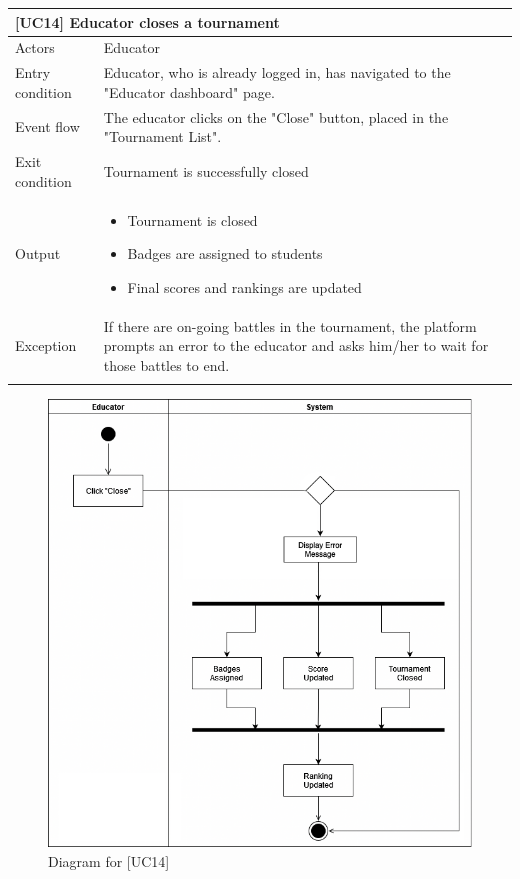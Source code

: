 \documentclass[12pt,oneside,a4paper]{article}
\begin{document}
\clearpage

\begin{table}[htbp]
\begin{tabular}{|l|p{12cm}|}
    \hline
    \multicolumn{2}{|l|}{\textbf{[UC14] Educator closes a tournament}}\\
    \hline
    Actors & Educator\\
    \hline
    Entry condition & Educator, who is already logged in, has navigated to the "Educator dashboard" page.\\
    \hline
    Event flow & The educator clicks on the "Close" button, placed in the "Tournament List".\\
    \hline
    Exit condition & Tournament is successfully closed\\
    \hline
    Output & \begin{itemize}
        \item Tournament is closed
        \item Badges are assigned to students
        \item Final scores and rankings are updated
    \end{itemize}\\
    \hline
    Exception & If there are on-going battles in the tournament, the platform prompts an error to the educator and asks him/her to wait for those battles to end.\\
    \lasthline
\end{tabular}
\end{table}

\clearpage

\begin{figure}[htbp]
    \centering
    \includegraphics[width=1\linewidth]{Images/Diagrams/CloseTournament.png}
    \caption{Diagram for [UC14]}
    \label{fig:enter-label}
\end{figure}
\end{document}
